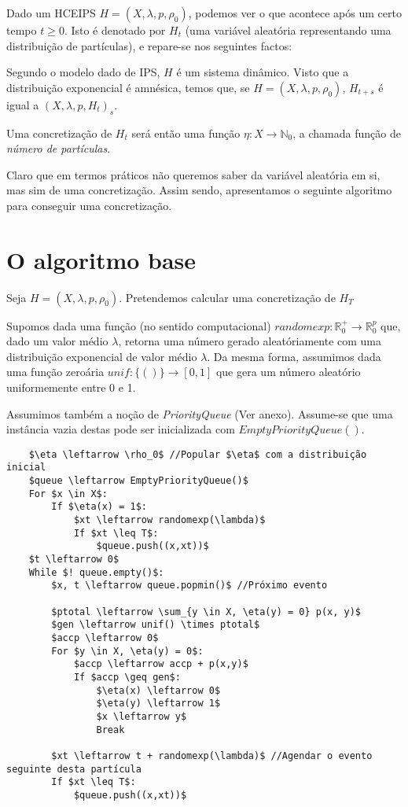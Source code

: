 \documentclass{article}
\newcommand{\N}{\mathbb{N}}
\newcommand{\R}{\mathbb{R}}
\begin{document}
	Dado um HCEIPS $H = (X, \lambda, p, \rho_0)$, podemos ver o que acontece após um certo tempo $t \geq 0$. Isto é denotado por $H_t$ (uma variável aleatória representando uma distribuição de partículas), e repare-se nos seguintes factos:
	
	Segundo o modelo dado de IPS, $H$ é um sistema dinâmico. Visto que a distribuição exponencial é amnésica, temos que, se $H = (X, \lambda, p, \rho_0)$, $H_{t+s}$ é igual a $(X, \lambda, p, H_t)_s$.
	
	Uma concretização de $H_t$ será então uma função $\eta : X \rightarrow \N_0$, a chamada função de \emph{número de partículas}.
	
	Claro que em termos práticos não queremos saber da variável aleatória em si, mas sim de uma concretização. Assim sendo, apresentamos o seguinte algoritmo para conseguir uma concretização.
	
	\section{O algoritmo base}
	
	Seja $H = (X, \lambda, p, \rho_0)$. Pretendemos calcular uma concretização de $H_T$
	
	Supomos dada uma função (no sentido computacional) $randomexp : \R^+_0 \rightarrow \R^p_0$ que, dado um valor médio $\lambda$, retorna uma número gerado aleatóriamente com uma distribuição exponencial de valor médio $\lambda$. Da mesma forma, assumimos dada uma função zeroária $unif : \{()\} \rightarrow [0,1]$ que gera um número aleatório uniformemente entre 0 e 1.
	
	Assumimos também a noção de \emph{PriorityQueue} (Ver anexo). Assume-se que uma instância vazia destas pode ser inicializada com $EmptyPriorityQueue()$.
	
	\begin{lstlisting}
	$\eta \leftarrow \rho_0$ //Popular $\eta$ com a distribuição inicial
	$queue \leftarrow EmptyPriorityQueue()$
	For $x \in X$:
		If $\eta(x) = 1$:
			$xt \leftarrow randomexp(\lambda)$
			If $xt \leq T$:
				$queue.push((x,xt))$
	$t \leftarrow 0$
	While $! queue.empty()$:
		$x, t \leftarrow queue.popmin()$ //Próximo evento
		
		$ptotal \leftarrow \sum_{y \in X, \eta(y) = 0} p(x, y)$
		$gen \leftarrow unif() \times ptotal$
		$accp \leftarrow 0$
		For $y \in X, \eta(y) = 0$:
			$accp \leftarrow accp + p(x,y)$
			If $accp \geq gen$:
				$\eta(x) \leftarrow 0$
				$\eta(y) \leftarrow 1$
				$x \leftarrow y$
				Break
		
		$xt \leftarrow t + randomexp(\lambda)$ //Agendar o evento seguinte desta partícula
		If $xt \leq T$:
			$queue.push((x,xt))$
	\end{lstlisting}
	
\end{document}
